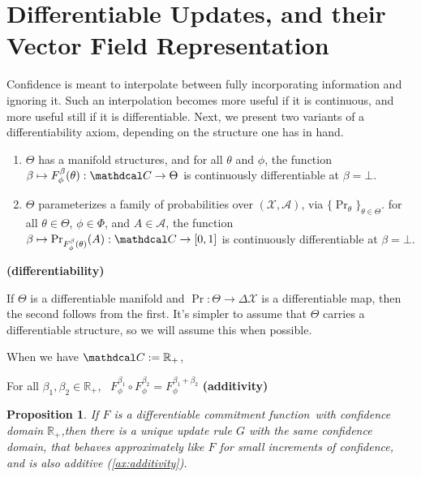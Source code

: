 \documentclass{uai2023}
\theoremstyle{plain}
\newtheorem{prop}[theorem]{Proposition}
\theoremstyle{definition}
\newcommand\cofunc{commitment function}
\newcommand\confdom{\mathdcal C}
\newcommand\Rplus{\mathbb R_+}
\newcommand\X{\mathcal X}
\begin{document}
 
\section{Differentiable Updates, and their
    Vector Field Representation}

Confidence is meant to interpolate between fully incorporating information and ignoring it.
Such an interpolation becomes more useful if it is continuous, and more useful still if it is differentiable.
Next, we present two variants of a differentiability axiom, depending on the structure one has in hand. 

\begin{CFaxioms}
	\item \label{ax:diffble}
	\begin{enumerate}
	\item $\Theta$ has a manifold structures, and
		for all $\theta$ and $\phi$, the function $\beta \mapsto F^{\beta}_\phi(\theta) : \confdom \to \Theta$
		is continuously differentiable at $\beta = \bot$. \item 
		$\Theta$ parameterizes a family of probabilities over $(\X, \mathcal A)$,
		via $\{ \Pr_\theta \}_{\theta \in \Theta}$.
for all $\theta \in \Theta$, $\phi \in \Phi$, and  $A \in \mathcal A$,
		the function $\beta \mapsto \Pr_{F^{\beta}_\phi(\theta)}(A)
		: \confdom \to \mathbb [0,1]$ is
		continuously differentiable at $\beta=\bot$. 
\label{ax:diffble2}
	\end{enumerate}
	\hfill \textbf{(differentiability)}
\end{CFaxioms}



If $\Theta$ is a differentiable manifold and $\Pr: \Theta \to \Delta\X$ is a differentiable map, then the second follows from the first. 
It's simpler to assume that $\Theta$ carries a differentiable structure, so we will assume this when possible.


When we have $\confdom := \Rplus$,

\TODO


\begin{CFaxioms}
	\item For all $\beta_1, \beta_2 \in \Rplus$,~
$F^{\beta_1}_\phi \circ F^{\beta_2}_\phi = F^{\beta_1 + \beta_2}_\phi$
\hfill \textbf{(additivity)} \label{ax:additivity}
\end{CFaxioms}




\begin{prop}
	If $F$ is a differentiable \cofunc\ with confidence domain $\Rplus$,then there is a unique update rule $G$ with the same confidence domain, that behaves approximately like $F$ for small increments of confidence, and is also additive (\cref{ax:additivity}).
\end{prop}
\end{document}
